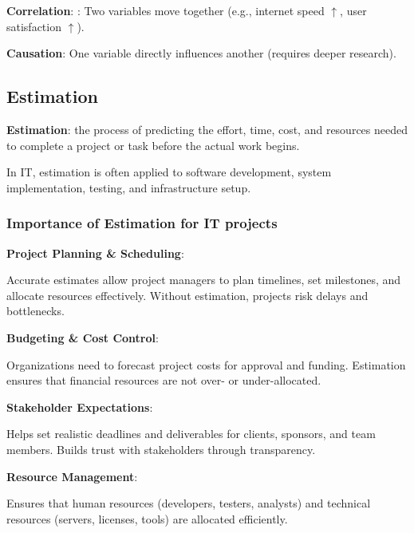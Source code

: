 \noindent\textbf{Correlation}: : Two variables move together (e.g., internet speed $\uparrow$, user satisfaction $\uparrow$).

\noindent\textbf{Causation}: One variable directly influences another (requires deeper research).

\subsection{Estimation}

\indent 

\noindent\textbf{Estimation}: the process of predicting the effort, time, cost, and resources needed to complete a project or task before the actual work begins.

\bigskip

In IT, estimation is often applied to software development, system implementation, testing, and infrastructure setup.

\subsubsection{Importance of Estimation for IT projects}

\indent

\noindent\textbf{Project Planning \& Scheduling}: 

Accurate estimates allow project managers to plan timelines, set milestones, and allocate resources effectively. Without estimation, projects risk delays and bottlenecks.

\bigskip

\noindent\textbf{Budgeting \& Cost Control}:

Organizations need to forecast project costs for approval and funding. Estimation ensures that financial resources are not over- or under-allocated.

\bigskip

\noindent\textbf{Stakeholder Expectations}:

Helps set realistic deadlines and deliverables for clients, sponsors, and team 
members. Builds trust with stakeholders through transparency.

\bigskip

\noindent\textbf{Resource Management}:

Ensures that human resources (developers, testers, analysts) and technical resources (servers, licenses, tools) are allocated efficiently.

\bigskip


